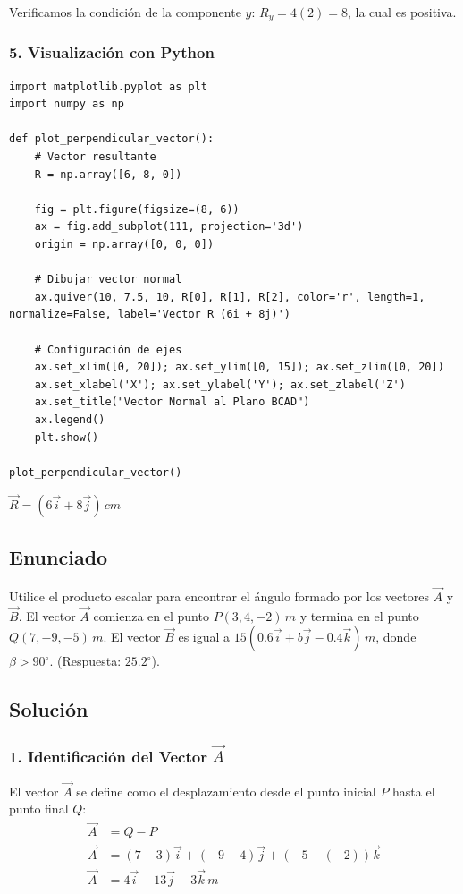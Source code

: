 \documentclass[12pt, a4paper]{article}
\begin{document}
Verificamos la condición de la componente $y$: $R_y = 4(2) = 8$, la cual es positiva.

\subsubsection*{5. Visualización con Python}
\begin{lstlisting}
import matplotlib.pyplot as plt
import numpy as np

def plot_perpendicular_vector():
    # Vector resultante
    R = np.array([6, 8, 0])
    
    fig = plt.figure(figsize=(8, 6))
    ax = fig.add_subplot(111, projection='3d')
    origin = np.array([0, 0, 0])
    
    # Dibujar vector normal
    ax.quiver(10, 7.5, 10, R[0], R[1], R[2], color='r', length=1, normalize=False, label='Vector R (6i + 8j)')
    
    # Configuración de ejes
    ax.set_xlim([0, 20]); ax.set_ylim([0, 15]); ax.set_zlim([0, 20])
    ax.set_xlabel('X'); ax.set_ylabel('Y'); ax.set_zlabel('Z')
    ax.set_title("Vector Normal al Plano BCAD")
    ax.legend()
    plt.show()

plot_perpendicular_vector()
\end{lstlisting}

\begin{tcolorbox}[colback=green!5!white, colframe=green!50!black, title=Respuesta Final]
\centering \Large $\vec{R} = (6\vec{i} + 8\vec{j}) \, \si{cm}$
\end{tcolorbox}

\newpage

\subsection*{Enunciado}
Utilice el producto escalar para encontrar el ángulo formado por los vectores $\vec{A}$ y $\vec{B}$. El vector $\vec{A}$ comienza en el punto $P(3, 4, -2) \, \si{m}$ y termina en el punto $Q(7, -9, -5) \, \si{m}$. El vector $\vec{B}$ es igual a $15(0.6\vec{i} + b\vec{j} - 0.4\vec{k}) \, \si{m}$, donde $\beta > 90^\circ$. (Respuesta: $25.2^\circ$).

\subsection*{Solución}

\subsubsection*{1. Identificación del Vector $\vec{A}$}
El vector $\vec{A}$ se define como el desplazamiento desde el punto inicial $P$ hasta el punto final $Q$:
\begin{align*}
    \vec{A} &= Q - P \\
    \vec{A} &= (7 - 3)\vec{i} + (-9 - 4)\vec{j} + (-5 - (-2))\vec{k} \\
    \vec{A} &= 4\vec{i} - 13\vec{j} - 3\vec{k} \, \si{m}
\end{align*}
\end{document}

